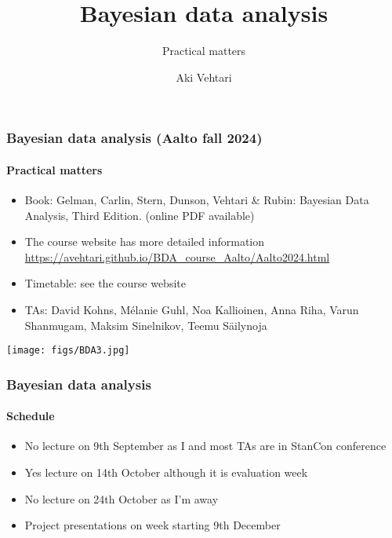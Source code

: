 \documentclass[english,t]{beamer}
\title[]{Bayesian data analysis}
\subtitle{Practical matters}
\author{Aki Vehtari}
\institute[Aalto University]{}
\begin{document}
\begin{frame}
  \frametitle{Bayesian data analysis (Aalto fall 2024)}  %
  \framesubtitle{Practical matters}
  
  \begin{itemize}
  \item Book: Gelman, Carlin, Stern, Dunson, Vehtari \& Rubin: Bayesian Data
    Analysis, Third Edition. {\footnotesize (online PDF available)}
  \item The course website has more detailed information\\
    {\small\url{https://avehtari.github.io/BDA_course_Aalto/Aalto2024.html}}
  \item Timetable: see the course website
  \item TAs: David Kohns, Mélanie Guhl, Noa Kallioinen, Anna Riha, Varun Shanmugam, Maksim Sinelnikov, Teemu
    Säilynoja
    \end{itemize}
    \vspace{-0.5\baselineskip}
 \begin{center}
   \texttt{[image: figs/BDA3.jpg]}
 \end{center}

\end{frame}

\begin{frame}

  \frametitle{Bayesian data analysis}  %
  \framesubtitle{Schedule}

  \begin{itemize}
  \item No lecture on 9th September as I and most TAs are in StanCon conference
  \item Yes lecture on 14th October although it is evaluation week
  \item No lecture on 24th October as I'm away
  \item Project presentations on week starting 9th December
  \end{itemize}
  
\end{frame}
\end{document}
